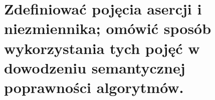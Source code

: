 \section{Zdefiniować pojęcia asercji i niezmiennika; omówić sposób wykorzystania tych pojęć w dowodzeniu semantycznej poprawności algorytmów.}
